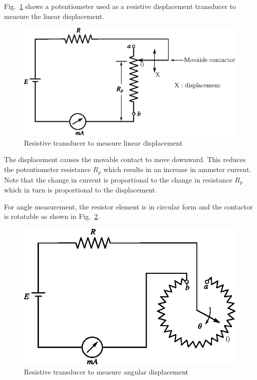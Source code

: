 Fig.~\ref{fig8.12} shows a potentiometer used as a resistive displacement transducer to measure the linear displacement.
\begin{figure}[H]
\centering
\includegraphics[scale=.9]{chap8/fig8.12.eps}
\caption{Resistive transducer to measure linear displacement}\label{fig8.12}
\end{figure}

The displacement causes the movable contact to move downward. This reduces the potentiometer resistance $R_{p}$ which results in an increase in ammeter current. Note that the change in current is proportional to the change in resistance $R_{p}$ which in turn is proportional to the displacement.

For angle measurement, the resistor element is in circular form and the contactor is rotatable as shown in Fig.~\ref{fig8.13}.
\begin{figure}[H]
\centering
\includegraphics[scale=.9]{chap8/fig8.13.eps}
\caption{Resistive transducer to measure angular displacement}\label{fig8.13}
\end{figure}

